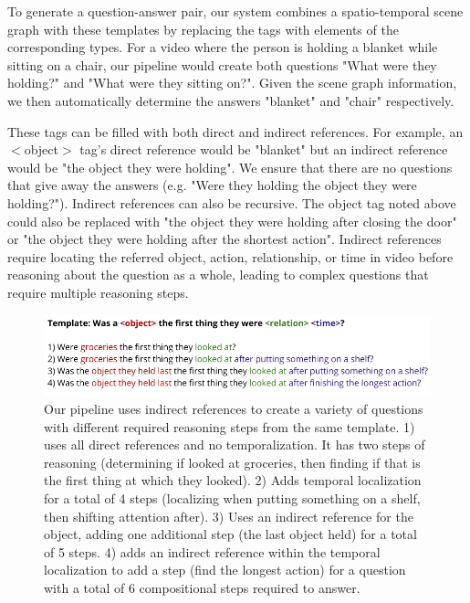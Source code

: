 \documentclass[10pt,twocolumn,letterpaper]{article}
\begin{document}
To generate a question-answer pair, our system combines a spatio-temporal scene graph with these templates by replacing the tags with elements of the corresponding types. For a video where the person is holding a blanket while sitting on a chair, our pipeline would create both questions "What were they holding?" and "What were they sitting on?". Given the scene graph information, we then automatically determine the answers "blanket" and "chair" respectively. 

These tags can be filled with both direct and indirect references. For example, an $<$object$>$ tag's direct reference would be "blanket" but an indirect reference would be "the object they were holding". We ensure that there are no questions that give away the answers (e.g. "Were they holding the object they were holding?"). Indirect references can also be recursive. The object tag noted above could also be replaced with "the object they were holding after closing the door" or "the object they were holding after the shortest action". Indirect references require locating the referred object, action, relationship, or time in video before reasoning about the question as a whole, leading to complex questions that require multiple reasoning steps. 
    
    
\begin{figure}[t]
\begin{center}
\includegraphics[width=0.8\linewidth]{Figures/figure_indirect.png}
\end{center}
   \caption{Our pipeline uses indirect references to create a variety of questions with different required reasoning steps from the same template. 1) uses all direct references and no temporalization. It has two steps of reasoning (determining if looked at groceries, then finding if that is the first thing at which they looked). 2) Adds temporal localization for a total of 4 steps (localizing when putting something on a shelf, then shifting attention after). 3) Uses an indirect reference for the object, adding one additional step (the last object held) for a total of 5 steps. 4) adds an indirect reference within the temporal localization to add a step (find the longest action) for a question with a total of 6 compositional steps required to answer.}
\label{template_expansion}
\end{figure}
\end{document}

